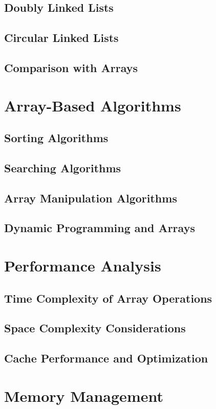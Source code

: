 \documentclass[12pt, oneside]{book}
\begin{document}
\section{Doubly Linked Lists}
\section{Circular Linked Lists}
\section{Comparison with Arrays}

\chapter{Array-Based Algorithms}
\section{Sorting Algorithms}
\section{Searching Algorithms}
\section{Array Manipulation Algorithms}
\section{Dynamic Programming and Arrays}

\chapter{Performance Analysis}
\section{Time Complexity of Array Operations}
\section{Space Complexity Considerations}
\section{Cache Performance and Optimization}

\chapter{Memory Management}
\end{document}
